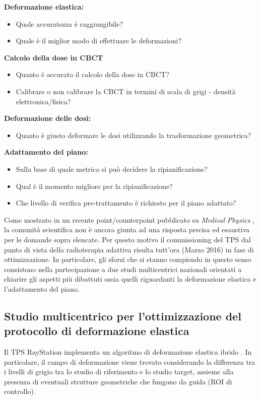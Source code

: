 \noindent\textbf{Deformazione elastica:}
\begin{itemize}
\item Quale accuratezza è raggiungibile?
\item Quale è il miglior modo di effettuare le deformazioni?
\end{itemize}
\textbf{Calcolo della dose in CBCT}
\begin{itemize}
\item Quanto è accurato il calcolo della dose in CBCT?
\item Calibrare o non calibrare la CBCT in termini di scala di grigi - densità elettronica/fisica?
\end{itemize}
\textbf{Deformazione delle dosi:}
\begin{itemize}
\item Quanto è giusto deformare le dosi utilizzando la trasformazione geometrica?
\end{itemize}
\textbf{Adattamento del piano:}
\begin{itemize}
\item Sulla base di quale metrica si può decidere la ripianificazione?
\item Qual è il momento migliore per la ripianificazione?
\item Che livello di verifica pre-trattamento è richiesto per il piano adattato?
\end{itemize}

Come mostrato in un recente point/counterpoint pubblicato su \textit{Medical Physics} \cite{Schultheiss2012}, la comunità scientifica non è ancora giunta ad una risposta precisa ed esaustiva per le domande sopra elencate. Per questo motivo il commissioning del TPS dal punto di vista della radioterapia adattiva risulta tutt'ora (Marzo 2016) in fase di ottimizzazione. In particolare, gli sforzi che si stanno compiendo in questo senso consistono nella partecipazione a due studi multicentrici nazionali orientati a chiarire gli aspetti più dibattuti ossia quelli riguardanti la deformazione elastica e l'adattamento del piano.

\subsection{Studio multicentrico per l'ottimizzazione del protocollo di deformazione elastica}
Il TPS RayStation implementa un algoritmo di deformazione elastica ibrido \cite{RaySearchLaboratories2014}. In particolare, il campo di deformazione viene trovato considerando la differenza tra i livelli di grigio tra lo studio di riferimento e lo studio target, assieme alla presenza di eventuali strutture geometriche che fungono da guida (ROI di controllo).


